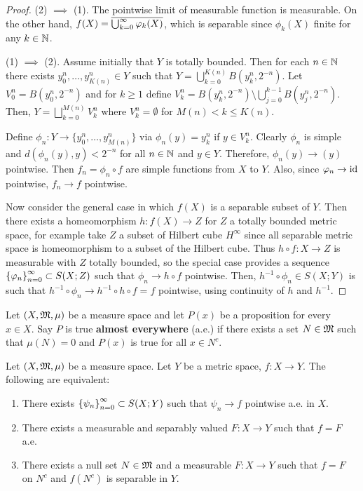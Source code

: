 \documentclass[a4paper]{article}
\begin{document}
\begin{proof}

(2) $\implies$ (1). The pointwise limit of measurable function 
is measurable. On the other hand, $f(X) = \overline{\bigcup_{k=0}^\infty \varphi_k(X)}$,
which is separable since $\phi_k(X)$ finite for any $k \in \mathbb{N}$.

(1) $\implies$ (2). Assume initially that $Y$ is totally bounded.
Then for each $n \in \mathbb{N}$ there exists $y^n_0, \dots, y^n_{K(n)} \in Y$
such that $Y = \bigcup_{k=0}^{K(n)} B(y^n_k, 2^{-n})$. 
Let $V^n_0 = B(y_0^n, 2^{-n})$ and for $k \geq 1$ define
$V^n_k = B(y^n_k, 2^{-n}) \setminus \bigcup_{j=0}^{k-1} 
B(y^n_j, 2^{-n})$. Then, $Y = \bigsqcup_{k=0}^{M(n)} V_k^n$
where $V^n_k = \emptyset$ for $M(n) < k \leq K(n)$.

Define $\phi_n: Y \to \{ y_0^n, \dots, y_{M(n)}^n \}$
via $\phi_n(y) = y_k^n$ if $y \in V_k^n$. Clearly $\phi_n$
is simple and $d(\phi_n(y), y) < 2^{-n}$ for all $n \in \mathbb{N}$
and $y \in Y$. Therefore, $\phi_n(y) \to (y)$ pointwise.
Then $f_n = \phi_n \circ f$ are simple functions
from $X$ to $Y$. Also, since $\varphi_n \to \operatorname{id}$ pointwise, 
$f_n \to f$ pointwise.

Now consider the general case in which $f(X)$ is a separable
subset of $Y$. Then there exists a homeomorphism $h: f(X) 
\to Z$ for $Z$ a totally bounded metric space, for example
take $Z$ a subset of Hilbert cube $H^\infty$ since 
all separable metric space is homeomorphism to a subset of 
the Hilbert cube. Thus $h \circ f: X \to Z$ is measurable
with $Z$ totally bounded, so the special case provides 
a sequence $\left\{ \varphi_n \right\}_{n=0}^\infty \subset S(X; Z)$ such that 
$\phi_n \to h \circ f$ pointwise. Then, 
$h^{-1} \circ \phi_n \in S(X; Y)$ is such that 
$h^{-1} \circ \phi_n \to h^{-1} \circ h \circ f = f$
pointwise, using continuity of $h$ and $h^{-1}$.

\end{proof}

\begin{defi}
  
Let $(X, \mathfrak{M}, \mu)$ be a measure space and let 
$P(x)$ be a proposition for every $x \in X$. Say 
$P$ is true \textbf{almost everywhere} (a.e.) if there exists 
a set $N \in \mathfrak{M}$ such that $\mu(N) = 0$ and 
$P(x)$ is true for all $x \in N^c$.

\end{defi}

\begin{thm}
  Let $(X, \mathfrak{M}, \mu)$ be a measure space. Let $Y$ be a 
  metric space, $f: X \to Y$. The following are equivalent:
  \begin{enumerate}
    \item There exists $\left\{ \psi_n \right\}_{n=0}^\infty \subset S(X; Y)$
    such that $\psi_n \to f$ pointwise a.e. in $X$.
    \item There exists a measurable and separably valued 
    $F : X \to Y$ such that $f = F$ a.e.
    \item There exists a null set $N \in \mathfrak{M}$ and a 
    measurable $F: X \to Y$ such that $f = F$ 
    on $N^c$ and $f(N^c)$ is separable in
    $Y$.
  \end{enumerate}
\end{thm}
\end{document}

